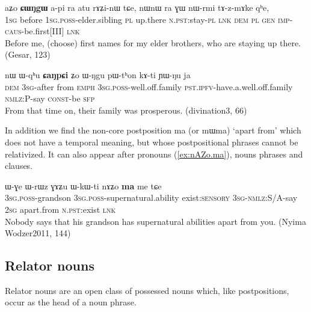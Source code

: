 \documentclass[oldfontcommands,oneside,a4paper,11pt]{article}
\newcommand{\ipa}[1]{{\phon \mbox{#1}}} %
\begin{document}
\begin{exe}
   \ex \label{ex:aZo.CWNgW}
 \gll 
\ipa{aʑo}  	\ipa{\textbf{ɕɯŋgɯ}}  	\ipa{a-pi}  	\ipa{ra}  	\ipa{atu}  	\ipa{rɤʑi-nɯ}  	\ipa{tɕe,}  	\ipa{nɯnɯ}  	\ipa{ra}  	\ipa{ɣɯ}  	\ipa{nɯ-rmi}  	\ipa{tɤ-z-mɤke}  	\ipa{qʰe,}   \\
\textsc{1sg} before \textsc{1sg.poss}-elder.sibling \textsc{pl} up.there \textsc{n.pst}:stay-\textsc{pl} \textsc{lnk} \textsc{dem} \textsc{pl} \textsc{gen} \textsc{imp-caus}-be.first[III] \textsc{lnk} \\
\glt Before me, (choose) first names for my elder brothers, who are staying up there. (Gesar, 123)
 \end{exe}
\begin{exe}
\ex \label{ex:CaNpCi1} 
\gll  
\ipa{nɯ}   	\ipa{ɯ-qʰu}   	\textbf{\ipa{ɕaŋpɕi}}   	\ipa{ʑo}   	\ipa{ɯ-ŋgu}   	\ipa{pɯ-tʰon}   	\ipa{kɤ-ti}   	\ipa{ɲɯ-ŋu}   	\ipa{ja}   \\
\textsc{dem} \textsc{3sg}-after from  \textsc{emph} \textsc{3sg.poss}-well.off.family  \textsc{pst.ipfv}-have.a.well.off.family \textsc{nmlz:P}-say \textsc{const}-be \textsc{sfp} \\
\glt  From that time on, their family was prosperous.   (divination3, 66)
\end{exe}

 In addition we find the non-core postposition \ipa{ma} (or \ipa{mɯma}) `apart from' which does not have a temporal meaning, but whose postpositional phrases cannot be relativized. It can also appear after pronouns (\ref{ex:nAZo.ma}), nouns phrases and clauses.
 \begin{exe}
\ex \label{ex:nAZo.ma} 
\gll  
 \ipa{ɯ-ɣe}  	\ipa{ɯ-rɯz}  	\ipa{ɣɤʑu}  	\ipa{ɯ-kɯ-ti}  	 	\ipa{nɤʑo}  	\ipa{\textbf{ma}}  	\ipa{me}  	\ipa{tɕe}  \\
  \textsc{3sg.poss}-grandson   \textsc{3sg.poss}-supernatural.ability exist:\textsc{sensory} \textsc{3sg-nmlz:S/A}-say \textsc{2sg} apart.from \textsc{n.pst}:exist \textsc{lnk} \\
\glt Nobody says that his grandson has supernatural abilities apart from you. (Nyima Wodzer2011, 144)
\end{exe}

\subsection{Relator nouns} \label{sec:relator}
Relator nouns are an open class of possessed nouns which, like postpositions, occur as the head of a noun phrase. 
\end{document}
